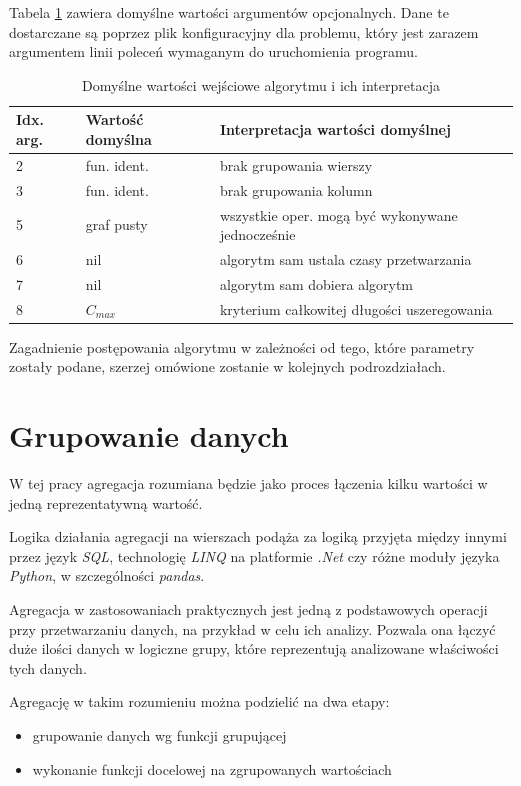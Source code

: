 \documentclass[brudnopis]{xmgr}
\begin{document}
Tabela \ref{tab:args-default} zawiera domyślne wartości argumentów opcjonalnych. Dane te dostarczane są poprzez plik konfiguracyjny dla problemu, który jest zarazem argumentem linii poleceń wymaganym do uruchomienia programu.
\medskip

\begin{table}[!tbh]
\begin{tabular}{|l|l|l|} \hline
Idx. arg. & Wartość domyślna & Interpretacja wartości domyślnej \\ \hline
2 & fun. ident. & brak grupowania wierszy \\ \hline
3 & fun. ident. & brak grupowania kolumn \\ \hline
5 & graf pusty  & wszystkie oper. mogą być wykonywane jednocześnie \\ \hline
6 & nil         & algorytm sam ustala czasy przetwarzania \\ \hline
7 & nil         & algorytm sam dobiera algorytm \\ \hline
8 & $C_{max}$   & kryterium całkowitej długości uszeregowania \\ \hline
\end{tabular}
\caption{Domyślne wartości wejściowe algorytmu i ich interpretacja\label{tab:args-default}}
\end{table}
\medskip

Zagadnienie postępowania algorytmu w zależności od tego, które parametry zostały podane, szerzej omówione zostanie w kolejnych podrozdziałach.


\section{Grupowanie danych}

W tej pracy agregacja rozumiana będzie jako proces łączenia kilku wartości w jedną reprezentatywną wartość.
\medskip

Logika działania agregacji na wierszach podąża za logiką przyjęta między innymi przez język \emph{SQL}, technologię \emph{LINQ} \cite{linq} na platformie \emph{.Net} czy różne moduły języka \emph{Python}, w szczególności \emph{pandas}.
\medskip

Agregacja w zastosowaniach praktycznych jest jedną z podstawowych operacji przy przetwarzaniu danych, na przykład w celu ich analizy.
Pozwala ona łączyć duże ilości danych w logiczne grupy, które reprezentują analizowane właściwości tych danych.
\medskip

Agregację w takim rozumieniu można podzielić na dwa etapy:
\begin{itemize}
    \item grupowanie danych wg funkcji grupującej
    \item wykonanie funkcji docelowej na zgrupowanych wartościach
\end{itemize}
\medskip
\end{document}
